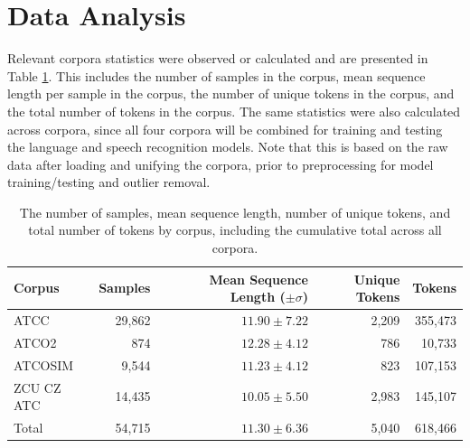 \documentclass[12pt]{article}
\begin{document}
\section{Data Analysis}\label{sec:data_analysis}
Relevant corpora statistics were observed or calculated and are presented in Table \ref{tab:corpora_stats}. This includes the number of samples in
the corpus, mean sequence length per sample in the corpus, the number of unique tokens in the corpus, and the total number of tokens in the corpus.
The same statistics were also calculated across corpora, since all four corpora will be combined for training and testing the language and speech
recognition models. Note that this is based on the raw data after loading and unifying the corpora, prior to preprocessing for model training/testing
and outlier removal.


\begin{table}[!t]
    \centering
    \begin{tabular}{l r r r r}
        \toprule
        \textbf{Corpus} & \textbf{Samples} & \textbf{Mean Sequence Length (\(\pm \sigma\))} & \textbf{Unique Tokens} & \textbf{Tokens} \\
        \midrule
        ATCC            & 29,862           & \(11.90 \pm 7.22\)                             & 2,209                  & 355,473         \\
        ATCO2           & 874              & \(12.28 \pm 4.12\)                             & 786                    & 10,733          \\
        ATCOSIM         & 9,544            & \(11.23 \pm 4.12\)                             & 823                    & 107,153         \\
        ZCU CZ ATC      & 14,435           & \(10.05 \pm 5.50\)                             & 2,983                  & 145,107         \\
        \midrule
        Total           & 54,715           & \(11.30 \pm 6.36\)                             & 5,040                  & 618,466         \\
        \bottomrule
    \end{tabular}
    \caption{The number of samples, mean sequence length, number of unique tokens, and total number of tokens by corpus, including the cumulative
        total across all corpora.}
    \label{tab:corpora_stats}
\end{table}
\end{document}
